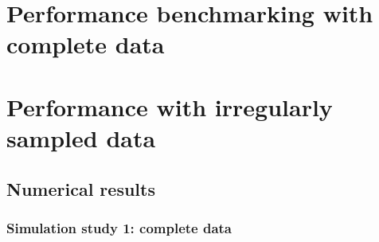 \documentclass[12pt]{article}
\newcommand*\needsparaphrased{\color{red}}
\theoremstyle{definition}
\begin{document}
%

\bigskip



\section{Performance benchmarking with complete data}












\section{Performance with irregularly sampled data}



\bigskip


{\needsparaphrased{TODO: remember to cite the nlme package for fitting the MA(1) and CS oracle models.}}





\subsection{Numerical results}
\subsubsection{Simulation study 1: complete data} \label{benchmarking-results}

\setlength{\dashlinedash}{0.5pt}
\setlength{\dashlinegap}{1pt}
\setlength{\arrayrulewidth}{0.2pt}
\end{document}
